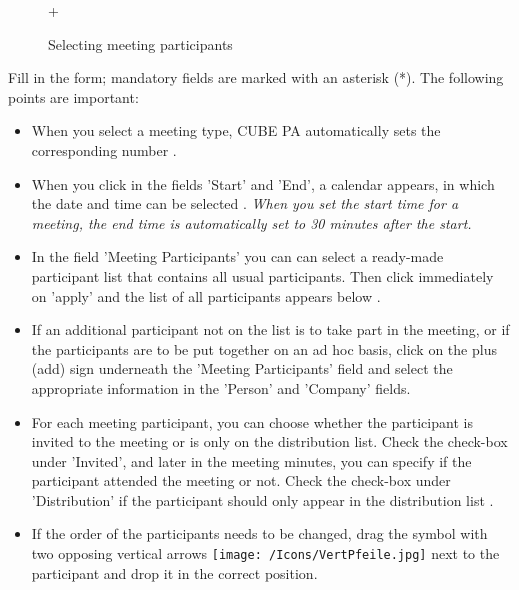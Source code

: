 \begin{figure}[H]
+
\caption{Selecting meeting participants}
\end{figure}

Fill in the form; mandatory fields are marked with an asterisk (*). The following points are important:

\begin{itemize}
\item 
When you select a meeting type, CUBE PA automatically sets the corresponding number .
\item 
When you click in the fields 'Start' and 'End', a calendar appears, in which the date and time can be selected . \textit{When you set the start time for a meeting, the end time is automatically set to 30 minutes after the start.}
\item 
In the field 'Meeting Participants' you can can select a ready-made participant list  that contains all usual participants. Then click immediately on 'apply'  and the list of all participants appears below .
\item 
If an additional participant not on the list is to take part in the meeting, or if the participants are to be put together on an ad hoc basis, click on the plus (add) sign  underneath the 'Meeting Participants' field and select the appropriate information in the 'Person' and 'Company' fields. 
\item
For each meeting participant, you can choose whether the participant is invited to the meeting or is only on the distribution list. Check the check-box  under 'Invited', and later in the meeting minutes, you can specify if the participant attended the meeting or not. Check the check-box under 'Distribution' if the participant should only appear in the distribution list .
\item 
If the order of the participants needs to be changed, drag the symbol with two opposing vertical arrows \texttt{[image: /Icons/VertPfeile.jpg]}  next to the participant and drop it in the correct position.

\end{itemize}
